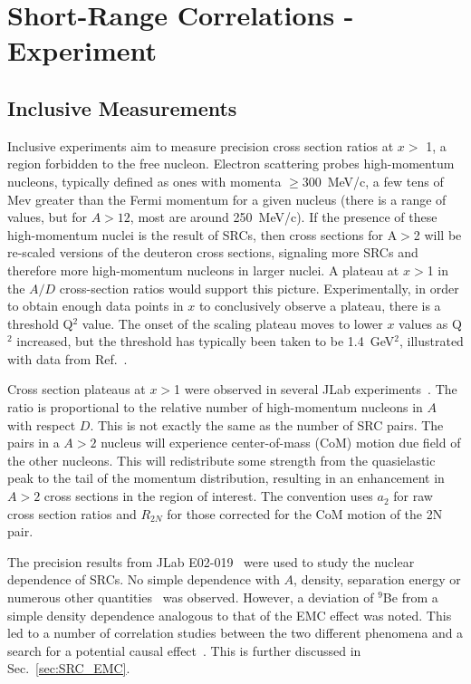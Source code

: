 \section{Short-Range Correlations - Experiment}
\subsection{Inclusive Measurements}
Inclusive experiments aim to measure precision cross section ratios at $x >$ 1, a region forbidden to the free nucleon.   Electron scattering probes high-momentum nucleons, typically defined as ones with momenta $\ge$300~MeV/c, a few tens of Mev greater than the Fermi momentum for a given nucleus (there is a range of values, but for $A>12$, most are around 250~MeV/c). If the presence of these high-momentum nuclei is the result of SRCs, then cross sections for A$>$2 will be re-scaled versions of the deuteron cross sections, signaling more SRCs and therefore more high-momentum nucleons in larger nuclei.   A plateau at $x>$1 in the $A/D$ cross-section ratios would support this picture.    Experimentally, in order to obtain enough data points in $x$ to conclusively observe a plateau, there is a threshold Q$^2$ value.  The onset of the scaling plateau moves to lower $x$ values as Q$^2$ increased, but the threshold has typically been taken to be 1.4~GeV$^2$, illustrated with data from Ref.~\cite{egiyan2003}.

Cross section plateaus at $x>$1 were observed in several JLab experiments~\cite{egiyan2003, fomin2012}.  The ratio is proportional to the relative number of high-momentum nucleons in $A$ with respect $D$.  This is not exactly the same as the number of SRC pairs.   The pairs in a $A>2$ nucleus will experience center-of-mass (CoM) motion due field of the other nucleons.  This will redistribute some strength from the quasielastic peak to the tail of the momentum distribution, resulting in an enhancement in $A>2$ cross sections in the region of interest.  The convention uses $a_2$ for raw cross section ratios and $R_{2N}$ for those corrected for the CoM motion of the 2N pair. 


The precision results from JLab E02-019~\cite{fomin2012} were used to study the nuclear dependence of SRCs. No simple dependence with $A$, density, separation energy or numerous other quantities~\cite{arrington12} was observed.  However, a deviation of $^9$Be from a simple density dependence analogous to that of the EMC effect was noted.  This led to a number of correlation studies between the two different phenomena and a search for a potential causal effect~\cite{arrington12, Hen:2012fm, Weinstein:2010rt}.  This is further discussed in Sec.~\ref{sec:SRC_EMC}.

